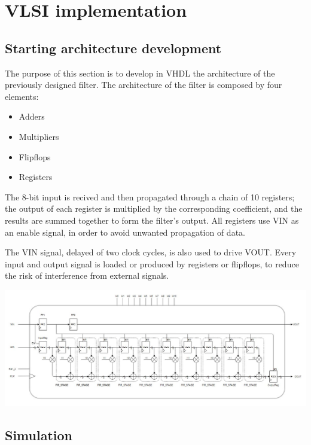 %
\chapter{VLSI implementation}
\label{cha2}
\section{Starting architecture development}

The purpose of this section is to develop in VHDL the architecture of the previously designed filter. 
The architecture of the filter is composed by four elements:

\begin{itemize}
    \item Adders
    \item Multipliers
    \item Flipflops
    \item Registers
\end{itemize}

The 8-bit input is recived and then propagated through a chain of 10 registers;
the output of each register is multiplied by the corresponding coefficient, and the results are summed together to form the
filter's output. 
All registers use VIN as an enable signal, in order to avoid unwanted propagation of data. 

The VIN signal, delayed of two clock cycles, is also used to drive VOUT. Every input and output signal is loaded or 
produced by registers or flipflops, to reduce the risk of interference from external signals.


\centerline{
\includegraphics[width=15.5cm]{./chapters/figures/fir_base.jpg}} 

\section{Simulation}

